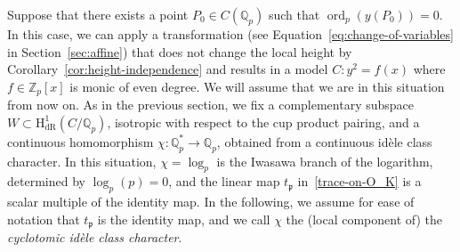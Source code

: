 \documentclass[11pt, a4paper]{amsart}
\newcommand{\Q}{\mathbb{Q}}
\newcommand{\Z}{\mathbb{Z}}
\newcommand{\p}{\mathfrak{p}}
\newcommand{\hdr}{\operatorname{H^1_{dR}}}
\newcommand{\ord}{\operatorname{ord}}
\theoremstyle{remark}
\numberwithin{equation}{section}
\newcommand{\sg}{{}}
\newcommand{\sm}{{}}
\begin{document}
\sg{Suppose that there exists a point $P_0\in C(\Q_p)$ such that $\ord_p(y(P_0))=0$. In this case, we can apply a transformation (see Equation~\eqref{eq:change-of-variables} in \sg{Section~\ref{sec:affine}}) that does not
change the local height by Corollary~\ref{cor:height-independence} and
results in a model $C\colon y^2=f(x)$ where $f\in\Z_p[x]$ is monic of even degree. }
We will assume that we are in this situation from now on.
\sm{
As in the previous section, we fix a complementary subspace
$W\subset \hdr(C/\Q_p)$, isotropic with respect to the cup product pairing,
and a continuous homomorphism $\chi\colon
\Q_p^{\ast}\longrightarrow\mathbb{Q}_p$, obtained from a continuous idèle class character.
In this situation, $\chi=\log_p$ is the Iwasawa branch of the logarithm, determined by $\log_p(p)=0$, and the linear map $t_\p$ in~\eqref{trace-on-O_K}  is a scalar multiple of the identity map. In the following, we assume for ease of notation that $t_\p$ is the identity map, and we call $\chi$ the (local component of) the \textit{cyclotomic id\`ele class character}.}

\end{document}
